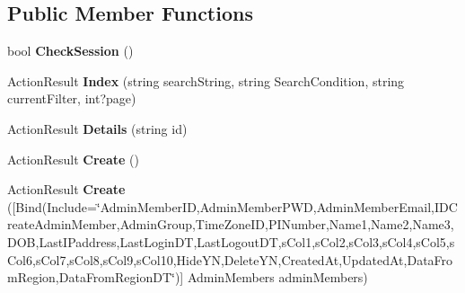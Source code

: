\subsection*{Public Member Functions}
\begin{DoxyCompactItemize}
\item 
bool {\bfseries Check\+Session} ()\hypertarget{class_cloud_bread_admin_web_1_1_controllers_1_1_admin_members_controller_ae75a6a4a1a36411c3472a24683595d80}{}\label{class_cloud_bread_admin_web_1_1_controllers_1_1_admin_members_controller_ae75a6a4a1a36411c3472a24683595d80}

\item 
Action\+Result {\bfseries Index} (string search\+String, string Search\+Condition, string current\+Filter, int?page)\hypertarget{class_cloud_bread_admin_web_1_1_controllers_1_1_admin_members_controller_aa17b4dbe6d2d8cae0e1875e711ddd02d}{}\label{class_cloud_bread_admin_web_1_1_controllers_1_1_admin_members_controller_aa17b4dbe6d2d8cae0e1875e711ddd02d}

\item 
Action\+Result {\bfseries Details} (string id)\hypertarget{class_cloud_bread_admin_web_1_1_controllers_1_1_admin_members_controller_abbc6eef41402b780f53cd8c50711c436}{}\label{class_cloud_bread_admin_web_1_1_controllers_1_1_admin_members_controller_abbc6eef41402b780f53cd8c50711c436}

\item 
Action\+Result {\bfseries Create} ()\hypertarget{class_cloud_bread_admin_web_1_1_controllers_1_1_admin_members_controller_a894aac9cf428c68dfca57e60a22a1c53}{}\label{class_cloud_bread_admin_web_1_1_controllers_1_1_admin_members_controller_a894aac9cf428c68dfca57e60a22a1c53}

\item 
Action\+Result {\bfseries Create} (\mbox{[}Bind(Include=\char`\"{}Admin\+Member\+ID,Admin\+Member\+P\+WD,Admin\+Member\+Email,I\+D\+Create\+Admin\+Member,Admin\+Group,Time\+Zone\+ID,P\+I\+Number,Name1,Name2,Name3,D\+OB,Last\+I\+Paddress,Last\+Login\+DT,Last\+Logout\+DT,s\+Col1,s\+Col2,s\+Col3,s\+Col4,s\+Col5,s\+Col6,s\+Col7,s\+Col8,s\+Col9,s\+Col10,Hide\+YN,Delete\+YN,Created\+At,Updated\+At,Data\+From\+Region,Data\+From\+Region\+DT\char`\"{})\mbox{]} Admin\+Members admin\+Members)\hypertarget{class_cloud_bread_admin_web_1_1_controllers_1_1_admin_members_controller_aa025c3227fb7390b03bb0194f06a5ae9}{}\label{class_cloud_bread_admin_web_1_1_controllers_1_1_admin_members_controller_aa025c3227fb7390b03bb0194f06a5ae9}


\end{DoxyCompactItemize}
